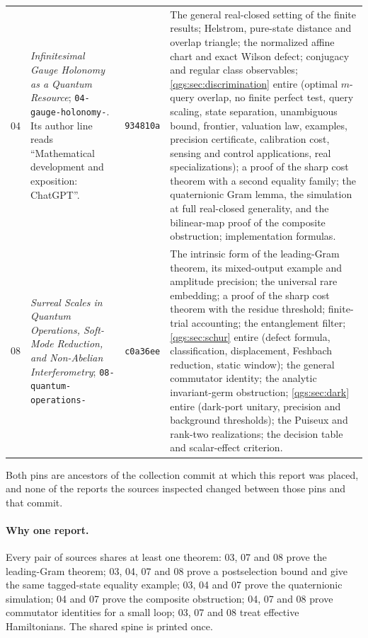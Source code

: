 \documentclass[11pt,oneside]{article}
\numberwithin{equation}{section}
\theoremstyle{plain}
\theoremstyle{definition}
\theoremstyle{remark}
\begin{document}
\begin{longtable}{@{}L{0.05\textwidth}L{0.27\textwidth}L{0.09\textwidth}L{0.49\textwidth}@{}}
04 & \emph{Infinitesimal Gauge Holonomy as a Quantum Resource}; \nolinkurl{04-gauge-holonomy-}. Its author line reads ``Mathematical development and exposition: ChatGPT''. & \texttt{934810a} & The general real-closed setting of the finite results; Helstrom, pure-state distance and overlap triangle; the normalized affine chart and exact Wilson defect; conjugacy and regular class observables; \cref{qgs:sec:discrimination} entire (optimal $m$-query overlap, no finite perfect test, query scaling, state separation, unambiguous bound, frontier, valuation law, examples, precision certificate, calibration cost, sensing and control applications, real specializations); a proof of the sharp cost theorem with a second equality family; the quaternionic Gram lemma, the simulation at full real-closed generality, and the bilinear-map proof of the composite obstruction; implementation formulas.\\[3pt]
08 & \emph{Surreal Scales in Quantum Operations, Soft-Mode Reduction, and Non-Abelian Interferometry}; \nolinkurl{08-quantum-operations-} & \texttt{c0a36ee} & The intrinsic form of the leading-Gram theorem, its mixed-output example and amplitude precision; the universal rare embedding; a proof of the sharp cost theorem with the residue threshold; finite-trial accounting; the entanglement filter; \cref{qgs:sec:schur} entire (defect formula, classification, displacement, Feshbach reduction, static window); the general commutator identity; the analytic invariant-germ obstruction; \cref{qgs:sec:dark} entire (dark-port unitary, precision and background thresholds); the Puiseux and rank-two realizations; the decision table and scalar-effect criterion.\\
\end{longtable}

Both pins are ancestors of the collection commit at which this report was placed, and none of the reports the sources inspected changed between those pins and that commit.

\paragraph{Why one report.} Every pair of sources shares at least one theorem: 03, 07 and 08 prove the leading-Gram theorem; 03, 04, 07 and 08 prove a postselection bound and give the same tagged-state equality example; 03, 04 and 07 prove the quaternionic simulation; 04 and 07 prove the composite obstruction; 04, 07 and 08 prove commutator identities for a small loop; 03, 07 and 08 treat effective Hamiltonians. The shared spine is printed once.
\end{document}
